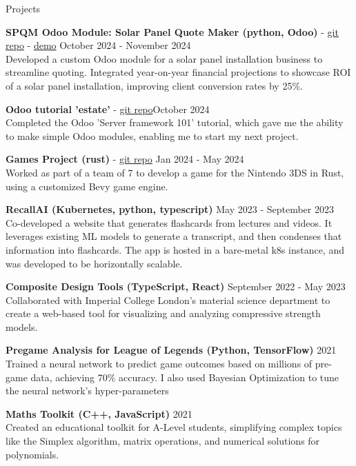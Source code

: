 \documentclass{resume} %
\begin{document}
\begin{rSection}{Projects}
\vspace{-1.25em}

\item \textbf{SPQM Odoo Module: Solar Panel Quote Maker (python, Odoo)}  - \href{https://github.com/ferdinandhubbard981/spqm}{git repo} - \href{http://109.132.176.243:8069/}{demo} \hfill October 2024 - November 2024 \\
Developed a custom Odoo module for a solar panel installation business to streamline quoting. Integrated year-on-year financial projections to showcase ROI of a solar panel installation, improving client conversion rates by 25\%. 

\item \textbf{Odoo tutorial 'estate'} - \href{https://github.com/ferdinandhubbard981/odoo-tutorials}{git repo}\hfill October 2024 \\
Completed the Odoo 'Server framework 101' tutorial, which gave me the ability to make simple Odoo modules, enabling me to start my next project.

\item \textbf{Games Project (rust)} - \href{https://github.com/Team-Yarg/these\_times\_of\_mine}{git repo} \hfill Jan 2024 - May 2024 \\
Worked as part of a team of 7 to develop a game for the Nintendo 3DS in Rust, using a customized Bevy game engine.

\pagebreak

\item \textbf{RecallAI (Kubernetes, python, typescript)} \hfill May 2023 - September 2023 \\
Co-developed a website that generates flashcards from lectures and videos. It leverages existing ML models to generate a transcript, and then condenses that information into flashcards. The app is hosted in a bare-metal k8s instance, and was developed to be horizontally scalable.

\item \textbf{Composite Design Tools (TypeScript, React)} \hfill September 2022 - May 2023 \\
Collaborated with Imperial College London's material science department to create a web-based tool for visualizing and analyzing compressive strength models.

\item \textbf{Pregame Analysis for League of Legends (Python, TensorFlow)} \hfill 2021 \\
Trained a neural network to predict game outcomes based on millions of pre-game data, achieving 70\% accuracy. I also used Bayesian Optimization to tune the neural network's hyper-parameters

\item \textbf{Maths Toolkit (C++, JavaScript)} \hfill 2021 \\
Created an educational toolkit for A-Level students, simplifying complex topics like the Simplex algorithm, matrix operations, and numerical solutions for polynomials.

\end{rSection}
\end{document}
